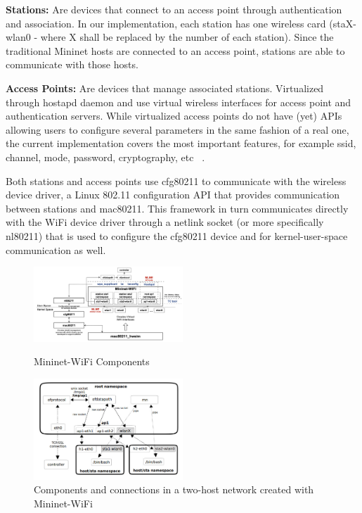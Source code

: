 \documentclass[
  oneside,
  11pt, a4paper,
  footinclude=true,
  headinclude=true,
  cleardoublepage=empty
]{scrbook}
\begin{document}
\textbf{Stations:} Are devices that connect to an access point through authentication and association. In our implementation, each station has one wireless card (staX-wlan0 - where X shall be replaced by the number of each station). Since the traditional Mininet hosts are connected to an access point, stations are able to communicate with those hosts.\par
\textbf{Access Points:} Are devices that manage associated stations. Virtualized through hostapd daemon and use virtual wireless interfaces for access point and authentication servers. While virtualized access points do not have (yet) APIs allowing users to configure several parameters in the same fashion of a real one, the current implementation covers the most important features, for example ssid, channel, mode, password, cryptography, etc ~\cite{mininet-wifibook}.\par
Both stations and access points use cfg80211 to communicate with the wireless device driver, a Linux 802.11 configuration API that provides communication between stations and mac80211. This framework in turn communicates directly with the WiFi device driver through a netlink socket (or more specifically nl80211) that is used to configure the cfg80211 device and for kernel-user-space communication as well.\par


\begin{figure}[H]
\begin{center}
  \includegraphics[width=0.5\textwidth]{img/12.png}
\end{center}
  \caption{Mininet-WiFi Components ~\cite{mininet-wifibook}}
  \centering  
  \label{componentes-mini}
  
\begin{center}  
  \includegraphics[width=0.5\textwidth]{img/13.png}
\end{center}
  \caption{Components and connections in a two-host network created with Mininet-WiFi ~\cite{mininet-wifibook}}
    \centering  
  \label{compomininet-conect}
\end{figure}
\end{document}
